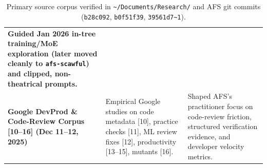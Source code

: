 \documentclass[10pt,letterpaper]{article}
\newcommand{\code}[1]{\texttt{\color{InkNavy}#1}}
\newcommand{\home}{\code{\textasciitilde}}
\begin{document}
\begin{table}[ht!]
\begin{tabularx}{\textwidth}{@{}>{\raggedright\bfseries\arraybackslash}p{3.9cm} >{\raggedright\arraybackslash}p{4.3cm} >{\raggedright\arraybackslash}X@{}}
Guided Jan 2026 in-tree training/MoE exploration (later moved cleanly to \code{afs-scawful}) and clipped, non-theatrical prompts. \\
\addlinespace[2.5pt]
Google DevProd \& Code-Review Corpus [10--16] (Dec 11--12, 2025) &
Empirical Google studies on code metadata [10], practice checks [11], ML review fixes [12], productivity [13--15], mutants [16]. &
Shaped AFS's practitioner focus on code-review friction, structured verification evidence, and developer velocity metrics. \\
\bottomrule
\end{tabularx}
\caption{Primary source corpus verified in \home\code{/Documents/Research/} and AFS git commits (\code{b28c092}, \code{b0f51f39}, \code{39561d7\textasciitilde1}).}
\label{tab:corpus}
\end{table}
\end{document}
